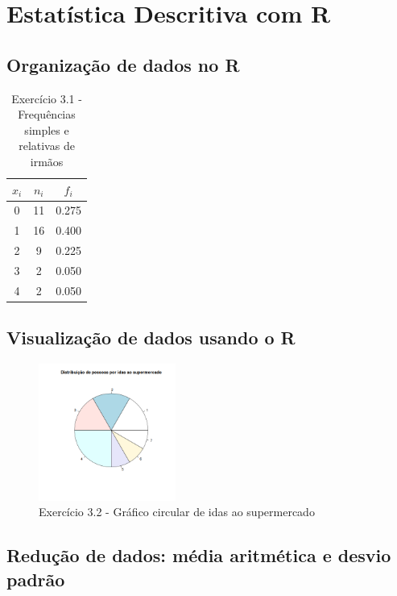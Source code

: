 \documentclass[11pt,a4paper]{report}
\begin{document}
\setcounter{chapter}{2}
\chapter{Estatística Descritiva com R}
\section{Organização de dados no R}

\begin{table}[h!]
	\centering
	\begin{tabular}{|c|c|c|}
		\hline
		$x_i$&$n_i$&$f_i$ \\
		\hline
		0&11&0.275\\
		\hline
		1&16&0.400\\
		\hline
		2& 9&0.225\\
		\hline
		3& 2&0.050\\
		\hline
		4& 2&0.050\\
		\hline
	\end{tabular}
	\caption{Exercício 3.1 - Frequências simples e relativas de irmãos}
	\label{tab:3.1}
\end{table}


\clearpage

\section{Visualização de dados usando o R}

\begin{figure}[h!]
	\centering
	\includegraphics[width=0.4\textwidth]{./recursos/ex3_2.png}
	\caption{Exercício 3.2 - Gráfico circular de idas ao supermercado}
\end{figure}


\clearpage
\section{Redução de dados: média aritmética e desvio padrão}
\end{document}
